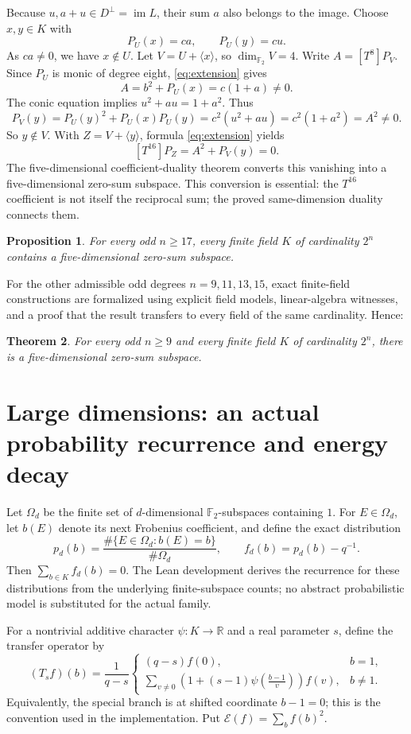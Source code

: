 \documentclass[11pt]{amsart}
\numberwithin{equation}{section}
\newtheorem{theorem}{Theorem}[section]
\newtheorem{proposition}[theorem]{Proposition}
\theoremstyle{definition}
\theoremstyle{remark}
\newcommand{\Ftwo}{\mathbb F_2}
\newcommand{\dimf}{\dim_{\Ftwo}}
\begin{document}
Because $u,a+u\in D^\perp=\operatorname{im}L$, their sum $a$ also belongs to the image. Choose $x,y\in K$ with
\[
 P_U(x)=ca,\qquad P_U(y)=cu.
\]
As $ca\ne0$, we have $x\notin U$. Let $V=U+\langle x\rangle$, so $\dimf V=4$. Write $A=[T^8]P_V$. Since $P_U$ is monic of degree eight, \eqref{eq:extension} gives
\[
 A=b^2+P_U(x)=c(1+a)\ne0.
\]
The conic equation implies $u^2+au=1+a^2$. Thus
\[
 P_V(y)=P_U(y)^2+P_U(x)P_U(y)
       =c^2(u^2+au)=c^2(1+a^2)=A^2\ne0.
\]
So $y\notin V$. With $Z=V+\langle y\rangle$, formula \eqref{eq:extension} yields
\[
 [T^{16}]P_Z=A^2+P_V(y)=0.
\]
The five-dimensional coefficient-duality theorem converts this vanishing into a five-dimensional zero-sum subspace. This conversion is essential: the $T^{16}$ coefficient is not itself the reciprocal sum; the proved same-dimension duality connects them.

\begin{proposition}\label{prop:k5large}
For every odd $n\ge17$, every finite field $K$ of cardinality $2^n$ contains a five-dimensional zero-sum subspace.
\end{proposition}

For the other admissible odd degrees $n=9,11,13,15$, exact finite-field constructions are formalized using explicit field models, linear-algebra witnesses, and a proof that the result transfers to every field of the same cardinality. Hence:
\begin{theorem}\label{thm:k5}
For every odd $n\ge9$ and every finite field $K$ of cardinality $2^n$, there is a five-dimensional zero-sum subspace.
\end{theorem}

\section{Large dimensions: an actual probability recurrence and energy decay}

Let $\Omega_d$ be the finite set of $d$-dimensional $\Ftwo$-subspaces containing $1$. For $E\in\Omega_d$, let $b(E)$ denote its next Frobenius coefficient, and define the exact distribution
\[
 p_d(b)=\frac{\#\{E\in\Omega_d:b(E)=b\}}{\#\Omega_d},\qquad
 f_d(b)=p_d(b)-q^{-1}.
\]
Then $\sum_{b\in K}f_d(b)=0$. The Lean development derives the recurrence for these distributions from the underlying finite-subspace counts; no abstract probabilistic model is substituted for the actual family.

For a nontrivial additive character $\psi:K\to\mathbb R$ and a real parameter $s$, define the transfer operator by
\[
 (T_sf)(b)=\frac{1}{q-s}\begin{cases}
 (q-s)f(0),&b=1,\\[2pt]
 \displaystyle\sum_{v\ne0}\left(1+(s-1)\psi\!\left(\frac{b-1}{v}\right)\right)f(v),&b\ne1.
 \end{cases}
\]
Equivalently, the special branch is at shifted coordinate $b-1=0$; this is the convention used in the implementation. Put $\mathcal E(f)=\sum_b f(b)^2$.
\end{document}
